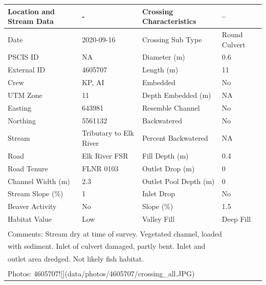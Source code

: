 \documentclass[
]{book}
\begin{document}
\begin{tabular}{llll}
\toprule
Location and Stream Data & - & Crossing Characteristics & --\\
\midrule
Date & 2020-09-16 & Crossing Sub Type & Round Culvert\\
PSCIS ID & NA & Diameter (m) & 0.6\\
External ID & 4605707 & Length (m) & 11\\
Crew & KP, AI & Embedded & No\\
UTM Zone & 11 & Depth Embedded (m) & NA\\
\addlinespace
Easting & 643981 & Resemble Channel & No\\
Northing & 5561132 & Backwatered & No\\
Stream & Tributary to Elk River & Percent Backwatered & NA\\
Road & Elk River FSR & Fill Depth (m) & 0.4\\
Road Tenure & FLNR 0103 & Outlet Drop (m) & 0\\
\addlinespace
Channel Width (m) & 2.3 & Outlet Pool Depth (m) & 0\\
Stream Slope (\%) & 1 & Inlet Drop & No\\
Beaver Activity & No & Slope (\%) & 1.5\\
Habitat Value & Low & Valley Fill & Deep Fill\\
\bottomrule
\multicolumn{4}{l}{\textsuperscript{} Comments: Stream dry at time of survey. Vegetated channel, loaded}\\
\multicolumn{4}{l}{with sediment. Inlet of culvert damaged, partly bent. Inlet and}\\
\multicolumn{4}{l}{outlet area dredged. Not likely fish habitat.}\\
\multicolumn{4}{l}{\textsuperscript{} Photos: 4605707![](data/photos/4605707/crossing\_all.JPG)}\\
\end{tabular}
\end{document}
